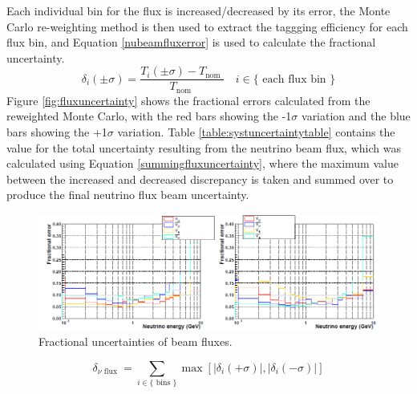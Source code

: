 Each individual bin for the flux is increased/decreased by its error, the Monte Carlo re-weighting method is then used to extract the taggging efficiency for each flux bin, and Equation \eqref{nubeamfluxerror} is used to calculate the fractional uncertainty.
\newline
\begin{equation}
    \delta_{i}(\pm \sigma)=\frac{T_{i}(\pm \sigma)-T_{\text {nom }}}{T_{\text {nom }}} \quad i \in\{\text { each flux bin }\}
\label{nubeamfluxerror}
\end{equation}
\newline
Figure \ref{fig:fluxuncertainty} shows the fractional errors calculated from the reweighted Monte Carlo, with the red bars showing the -1$\sigma$ variation and the blue bars showing the +1$\sigma$ variation. Table \ref{table:systuncertaintytable} contains the value for the total uncertainty resulting from the neutrino beam flux, which was calculated using Equation \eqref{summingfluxuncertainty}, where the maximum value between the increased and decreased discrepancy is taken and summed over to produce the final neutrino flux beam uncertainty.
\newline

\begin{figure}
    \includegraphics[width=\textwidth]{Figures/frac_beam_flux_uncertainty.png}
    \caption{Fractional uncertainties of beam fluxes.}
    \label{fig:frac_beam_flux_uncertainty}
\end{figure}


\begin{equation}
    \delta_{\nu \text { flux }}=\sum_{i \in\{\text { bins }\}} \max \left[\left|\delta_{i}(+\sigma)\right|,\left|\delta_{i}(-\sigma)\right|\right]
 \label{summingfluxuncertainty}   
\end{equation}

